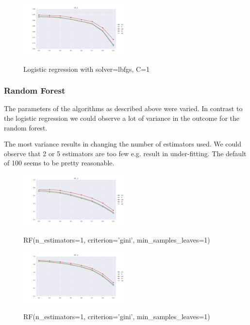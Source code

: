 \documentclass{sig-alternate-05-2015}
\begin{document}
\begin{figure}[h]
  \label{fig:lr}
  \centering
  \caption{Logistic regression with solver=lbfgs, C=1}
  \includegraphics[width=0.5\textwidth]{../plots/LR_1}
  \label{fig:anomalySetup}
\end{figure}

\subsubsection{Random Forest}
The parameters of the algorithms as described above were varied.
In contrast to the logistic regression we could observe a lot of variance in the outcome for the random forest.

The most variance results in changing the number of estimators used. We could observe that 2 or 5 estimators are too few e.g. result in under-fitting. The default of 100 seems to be pretty reasonable.

\begin{figure}[]
  \centering
  \caption{RF(n\_estimators=1, criterion='gini', min\_samples\_leaves=1)}
  \includegraphics[width=0.5\textwidth]{../plots/RF_1}
  \label{fig:anomalySetup}
\end{figure}

\begin{figure}[]
  \centering
  \caption{RF(n\_estimators=1, criterion='gini', min\_samples\_leaves=1)}
  \includegraphics[width=0.5\textwidth]{../plots/RF_2}
  \label{fig:anomalySetup}
\end{figure}
\end{document}
